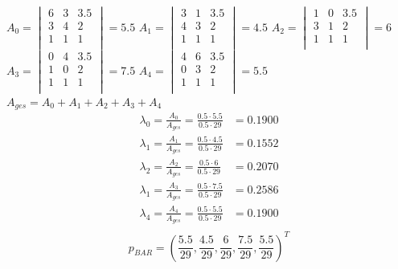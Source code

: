 \documentclass[a4paper,10pt,DIV=14]{article}
\begin{document}
$A_0 = \begin{vmatrix}
			6 & 3 &  3.5 \\
			3 & 4 &  2   \\
			1 & 1 &  1   \\
		\end{vmatrix} = 5.5 $
		\newline
		\newline
$A_1 = \begin{vmatrix}
			3 & 1 &  3.5 \\
			4 & 3 &  2   \\
			1 & 1 &  1   \\
		\end{vmatrix} = 4.5 $
		\newline
		\newline
$A_2 = \begin{vmatrix}
			1 & 0 &  3.5 \\
			3 & 1 &  2   \\
			1 & 1 &  1   \\
		\end{vmatrix} = 6 $
		\newline
		\newline
$A_3 = \begin{vmatrix}
			0 & 4 &  3.5 \\
			1 & 0 &  2   \\
			1 & 1 &  1   \\
		\end{vmatrix} = 7.5 $
		\newline
		\newline
$A_4 = \begin{vmatrix}
			4 & 6 &  3.5 \\
			0 & 3 &  2   \\
			1 & 1 &  1   \\
		\end{vmatrix} = 5.5 $
		\newline
		\newline
$A_{ges} = A_0 + A_1 + A_2 + A_3 + A_4$
\begin{align*}
\lambda_0 = \frac{A_0}{A_{ges}} = \frac{0.5 \cdot 5.5}{0.5 \cdot 29} & = 0.1900 \\
\lambda_1 = \frac{A_1}{A_{ges}} =\frac{0.5 \cdot 4.5}{0.5 \cdot 29} & = 0.1552 \\
\lambda_2 = \frac{A_2}{A_{ges}} =\frac{0.5 \cdot 6}{0.5 \cdot 29}   & = 0.2070 \\
\lambda_1 = \frac{A_3}{A_{ges}} =\frac{0.5 \cdot 7.5}{0.5 \cdot 29} & = 0.2586 \\
\lambda_4 = \frac{A_4}{A_{ges}} =\frac{0.5 \cdot 5.5}{0.5 \cdot 29} & = 0.1900 \\
\end{align*}
$$ p_{BAR} = \left( \frac{5.5}{29}, \frac{4.5}{29}, \frac{6}{29}, \frac{7.5}{29}, \frac{5.5}{29} \right)  ^T $$
\end{document}
